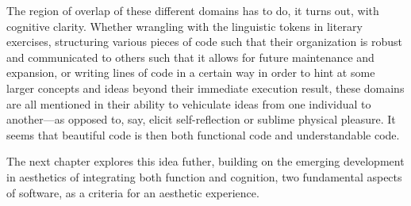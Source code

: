 The region of overlap of these different domains has to do, it turns out, with cognitive clarity. Whether wrangling with the linguistic tokens in literary exercises, structuring various pieces of code such that their organization is robust and communicated to others such that it allows for future maintenance and expansion, or writing lines of code in a certain way in order to hint at some larger concepts and ideas beyond their immediate execution result, these domains are all mentioned in their ability to vehiculate ideas from one individual to another—as opposed to, say, elicit self-reflection or sublime physical pleasure. It seems that beautiful code is then both functional code and understandable code.

The next chapter explores this idea futher, building on the emerging development in aesthetics of integrating both function and cognition, two fundamental aspects of software, as a criteria for an aesthetic experience.

